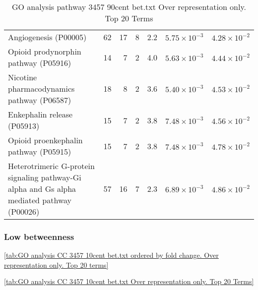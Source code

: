 \begin{table}[ht]
\begin{adjustbox}{width=\textwidth}
\begin{tabular}{lrrrrrr}
  Angiogenesis (P00005) & 62 & 17 & 8 & 2.2 & $5.75 \times 10^{-3}$ & $4.28 \times 10^{-2}$ \\ 
  Opioid prodynorphin pathway (P05916) & 14 & 7 & 2 & 4.0 & $5.63 \times 10^{-3}$ & $4.44 \times 10^{-2}$ \\ 
  Nicotine pharmacodynamics pathway (P06587) & 18 & 8 & 2 & 3.6 & $5.40 \times 10^{-3}$ & $4.53 \times 10^{-2}$ \\ 
  Enkephalin release (P05913) & 15 & 7 & 2 & 3.8 & $7.48 \times 10^{-3}$ & $4.56 \times 10^{-2}$ \\ 
  Opioid proenkephalin pathway (P05915) & 15 & 7 & 2 & 3.8 & $7.48 \times 10^{-3}$ & $4.78 \times 10^{-2}$ \\ 
  Heterotrimeric G-protein signaling pathway-Gi alpha and Gs alpha mediated pathway (P00026) & 57 & 16 & 7 & 2.3 & $6.89 \times 10^{-3}$ & $4.86 \times 10^{-2}$ \\ 
   \hline
\end{tabular}
\end{adjustbox}
\caption{GO analysis pathway 3457 90cent bet.txt Over representation only. Top 20 Terms} 
\label{tab:GO analysis pathway 3457 90cent bet.txt Over representation only. Top 20 Terms}
\end{table}





\clearpage
\subsubsection{Low betweenness}


\ref{tab:GO analysis CC 3457 10cent bet.txt ordered by fold change. Over representation only. Top 20 terms}

\ref{tab:GO analysis CC 3457 10cent bet.txt Over representation only. Top 20 Terms}



